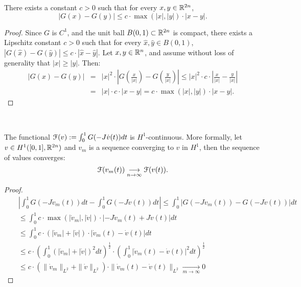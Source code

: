 \documentclass[../capacities_main.tex]{subfiles}
\begin{document}
\begin{Lemma}
	There exists a constant $c>0$ such that for every $x,y\in{\mathbb R}^{2n}$, 
	\[
	|G(x)-G(y)|\leq c\cdot \max(|x|,|y|)\cdot |x-y|.
	\]
\end{Lemma}

\begin{proof}
	Since $G$ is $C^1$, and the unit ball $B(0,1)\subset{\mathbb R}^{2n}$ is compact, there exists a Lipschitz constant $c>0$ such that for every $\hat x,\hat y\in B(0,1)$, $|G(\hat x)-G(\hat y)|\leq c\cdot |\hat x-\hat y|$. Let $x,y\in {\mathbb R}^n$, and assume without loss of generality that $|x|\geq|y|$. Then:
	\begin{eqnarray*}
		|G(x)-G(y)| &=& |x|^2\cdot \left|G\left(\frac{x}{|x|}\right)-G\left(\frac{y}{|x|}\right)\right|\leq |x|^2 \cdot c\cdot \left|\frac{x}{|x|}-\frac{y}{|x|}\right| \\
		&=& |x| \cdot c\cdot \left|x-y\right|  = c\cdot \max(|x|,|y|)\cdot |x-y|.
	\end{eqnarray*}
\end{proof}\

\begin{Lemma}
	The functional ${\mathcal F}(v):=\int_0^1 G(-J \dot v(t))dt$ is $H^1$-continuous. More formally, let $v\in H^1([0,1],{\mathbb R}^{2n})$ and $v_m$ is a sequence converging to $v$ in $H^1$, then the sequence of values converges:
	\[
	{\mathcal F}(v_m(t))\underset{n\rightarrow\infty}{\longrightarrow} {\mathcal F}(v(t)).
	\]
\end{Lemma}
\begin{proof}
	
	\begin{eqnarray*}
		&&\left|\int_0^1 G(-J \dot v_m(t))dt-\int_0^1 G(-J \dot v(t))dt\right| \leq \int_0^1 \left| G(-J \dot v_m(t))- G(-J\dot v(t))\right|dt\\
		&& \leq \int_0^1 c\cdot \max(|\dot v_m|,|\dot v|)\cdot |-J \dot v_m(t)+ J\dot v(t)|dt\\
		&& \leq \int_0^1 c\cdot (|\dot v_m|+|\dot v|)\cdot |\dot v_m(t)-\dot v(t)|dt\\
		&& \leq c\cdot \left(\int_0^1 (|\dot v_m|+|\dot v|)^2 dt\right)^{\frac{1}{2}}\cdot \left(\int_0^1 |\dot v_m(t)-\dot v(t)|^2 dt\right)^{\frac{1}{2}}\\
		&& \leq c\cdot (\|\dot v_m\|_{L^2}+\|\dot v\|_{L^2})\cdot \|\dot v_m(t)-\dot v(t)\|_{L^2} \underset{m\rightarrow\infty}{\longrightarrow}0
	\end{eqnarray*}
	
\end{proof}\
\end{document}
